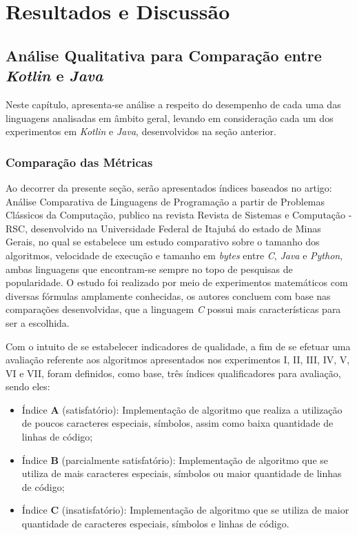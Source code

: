 \chapter{Resultados e Discussão}
\label{cap:04}

\section{Análise Qualitativa para Comparação entre \textit{Kotlin} e \textit{Java}}

Neste capítulo, apresenta-se análise a respeito do desempenho de cada uma das linguagens analisadas em âmbito geral, levando em consideração cada um dos experimentos em \textit{Kotlin} e \textit{Java}, desenvolvidos na seção anterior. 

\subsection{Comparação das Métricas}

Ao decorrer da presente seção, serão apresentados índices baseados no artigo: Análise Comparativa de Linguagens de Programação a partir de Problemas Clássicos da Computação, publico na revista Revista de Sistemas e Computação - RSC, desenvolvido na Universidade Federal de Itajubá do estado de Minas Gerais, no qual se estabelece um estudo comparativo sobre o tamanho dos algoritmos, velocidade de execução e tamanho em \textit{bytes} entre \textit{C}, \textit{Java} e \textit{Python}, ambas linguagens que encontram-se sempre no topo de pesquisas de popularidade. O estudo foi realizado por meio de experimentos matemáticos com diversas fórmulas amplamente conhecidas, os autores concluem com base nas comparações desenvolvidas, que a linguagem \textit{C} possui mais características para ser a escolhida.

Com o intuito de se estabelecer indicadores de qualidade, a fim de se efetuar uma avaliação referente aos algoritmos apresentados nos experimentos I, II, III, IV, V, VI e VII, foram definidos, como base, três índices qualificadores para avaliação, sendo eles:

\begin{itemize}
    \item Índice \textbf{A} (satisfatório): Implementação de algoritmo que realiza a utilização de poucos caracteres especiais, símbolos, assim como baixa quantidade de linhas de código;
     \item Índice \textbf{B} (parcialmente satisfatório): Implementação de algoritmo que se utiliza de mais caracteres especiais, símbolos ou maior quantidade de linhas de código;
      \item Índice \textbf{C} (insatisfatório): Implementação de algoritmo que se utiliza de maior quantidade de caracteres especiais, símbolos e linhas de código.
\end{itemize}

